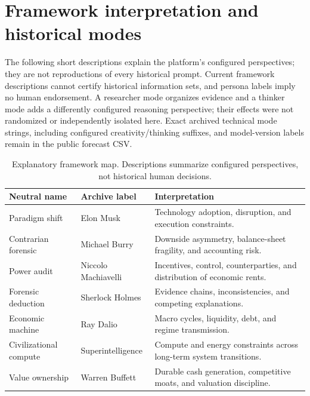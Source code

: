 \clearpage
\section{Framework interpretation and historical modes}\label{app:frameworks}
The following short descriptions explain the platform's configured perspectives; they are not reproductions of every historical prompt. Current framework descriptions cannot certify historical information sets, and persona labels imply no human endorsement. A researcher mode organizes evidence and a thinker mode adds a differently configured reasoning perspective; their effects were not randomized or independently isolated here. Exact archived technical mode strings, including configured creativity/thinking suffixes, and model-version labels remain in the public forecast CSV.
\begin{table}[H]
\centering\small
\begin{tabular}{p{.23\linewidth}p{.24\linewidth}p{.43\linewidth}}
\toprule
Neutral name & Archive label & Interpretation\\
\midrule
Paradigm shift & Elon Musk & Technology adoption, disruption, and execution constraints.\\
Contrarian forensic & Michael Burry & Downside asymmetry, balance-sheet fragility, and accounting risk.\\
Power audit & Niccolo Machiavelli & Incentives, control, counterparties, and distribution of economic rents.\\
Forensic deduction & Sherlock Holmes & Evidence chains, inconsistencies, and competing explanations.\\
Economic machine & Ray Dalio & Macro cycles, liquidity, debt, and regime transmission.\\
Civilizational compute & Superintelligence & Compute and energy constraints across long-term system transitions.\\
Value ownership & Warren Buffett & Durable cash generation, competitive moats, and valuation discipline.\\
\bottomrule
\end{tabular}
\caption{Explanatory framework map. Descriptions summarize configured perspectives, not historical human decisions.}
\end{table}
